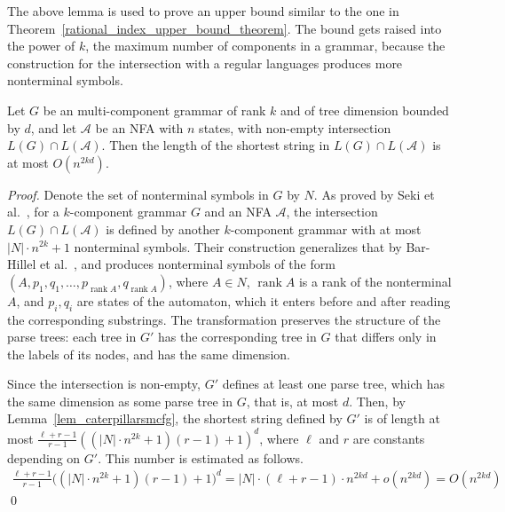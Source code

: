 \documentclass[runningheads]{llncs}
\newcommand{\ranksymb}{\mathop{\mathrm{rank}}}
\newcommand{\rank}[1]{\ranksymb #1}
\begin{document}
The above lemma is used to prove an upper bound
similar to the one in Theorem~\ref{rational_index_upper_bound_theorem}.
The bound gets raised into the power of $k$, the maximum number of components in a grammar,
because the construction for the intersection with a regular languages
produces more nonterminal symbols.

\begin{theorem}\label{rational_index_multi_upper_bound_theorem}
Let $G$ be an multi-component grammar of rank $k$ and of tree dimension bounded by $d$,
and let $\mathcal{A}$ be an NFA with $n$ states,
with non-empty intersection $L(G) \cap L(\mathcal{A})$.
Then the length of the shortest string in $L(G) \cap L(\mathcal{A})$ is at most $O(n^{2kd})$.
\end{theorem}
\begin{proof}
Denote the set of nonterminal symbols in $G$ by $N$.
As proved by Seki et al.~\cite[Thm.~3.9]{SekiMatsumuraFujiiKasami},
for a $k$-component grammar $G$ and an NFA $\mathcal{A}$,
the intersection $L(G) \cap L(\mathcal{A})$
is defined by another $k$-component grammar
with at most $|N| \cdot n^{2k} + 1$ nonterminal symbols.
Their construction generalizes that by Bar-Hillel et al.~\cite{BarHillel},
and produces nonterminal symbols of the form
$(A,p_1, q_1, \ldots, p_{\rank A}, q_{\rank A})$,
where $A \in N$,
$\rank A$ is a rank of the nonterminal $A$, 
and $p_i,q_i$ are states of the automaton,
which it enters before and after reading the corresponding substrings.
The transformation preserves the structure of the parse trees:
each tree in $G'$ has the corresponding tree in $G$
that differs only in the labels of its nodes,
and has the same dimension.

Since the intersection is non-empty, $G'$ defines at least one parse tree,
which has the same dimension as some parse tree in $G$,
that is, at most $d$.
Then, by Lemma~\ref{lem_caterpillarsmcfg},
the shortest string defined by $G'$
is of length at most
$\frac{\ell+r-1}{r-1} ((|N| \cdot n^{2k} + 1)(r-1) + 1)^d$,
where $\ell$ and $r$ are constants depending on $G'$.
This number is estimated as follows.
\begin{multline*}
	\frac{\ell+r-1}{r-1} \big((|N| \cdot n^{2k} + 1)(r-1) + 1\big)^d
		=
	|N| \cdot (\ell+r-1) \cdot n^{2kd} + o(n^{2kd})
		=
	O(n^{2kd})
\end{multline*}
\qed
\end{proof}
\end{document}
